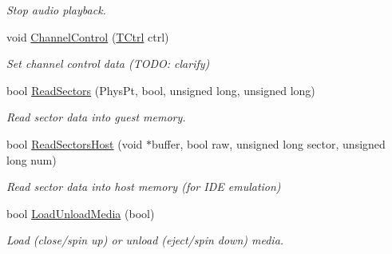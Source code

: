 \begin{DoxyCompactItemize}
\begin{DoxyCompactList}\small\item\em Stop audio playback. \end{DoxyCompactList}\item 
\hypertarget{classCDROM__Interface__Fake_ac967a7a0cb63fcff3756df64a70ab75d}{void \hyperlink{classCDROM__Interface__Fake_ac967a7a0cb63fcff3756df64a70ab75d}{Channel\-Control} (\hyperlink{structSCtrl}{T\-Ctrl} ctrl)}\label{classCDROM__Interface__Fake_ac967a7a0cb63fcff3756df64a70ab75d}

\begin{DoxyCompactList}\small\item\em Set channel control data (T\-O\-D\-O\-: clarify) \end{DoxyCompactList}\item 
\hypertarget{classCDROM__Interface__Fake_a9370d0f056300f877bc0b4174e00015c}{bool \hyperlink{classCDROM__Interface__Fake_a9370d0f056300f877bc0b4174e00015c}{Read\-Sectors} (Phys\-Pt, bool, unsigned long, unsigned long)}\label{classCDROM__Interface__Fake_a9370d0f056300f877bc0b4174e00015c}

\begin{DoxyCompactList}\small\item\em Read sector data into guest memory. \end{DoxyCompactList}\item 
\hypertarget{classCDROM__Interface__Fake_aafcfe3998571eeef207deb0cbe18e9ba}{bool \hyperlink{classCDROM__Interface__Fake_aafcfe3998571eeef207deb0cbe18e9ba}{Read\-Sectors\-Host} (void $\ast$buffer, bool raw, unsigned long sector, unsigned long num)}\label{classCDROM__Interface__Fake_aafcfe3998571eeef207deb0cbe18e9ba}

\begin{DoxyCompactList}\small\item\em Read sector data into host memory (for I\-D\-E emulation) \end{DoxyCompactList}\item 
\hypertarget{classCDROM__Interface__Fake_ab0b585769fd626ad3af41bb8cf876fdb}{bool \hyperlink{classCDROM__Interface__Fake_ab0b585769fd626ad3af41bb8cf876fdb}{Load\-Unload\-Media} (bool)}\label{classCDROM__Interface__Fake_ab0b585769fd626ad3af41bb8cf876fdb}

\begin{DoxyCompactList}\small\item\em Load (close/spin up) or unload (eject/spin down) media. \end{DoxyCompactList}\end{DoxyCompactItemize}


